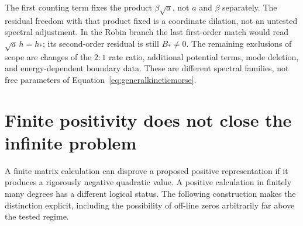 \documentclass[11pt,letterpaper]{article}
\numberwithin{equation}{section}
\theoremstyle{definition}
\theoremstyle{remark}
\begin{document}
The first counting term fixes the product $\beta\sqrt a$, not $a$ and $\beta$ separately. The residual freedom with that product fixed is a coordinate dilation, not an untested spectral adjustment. In the Robin branch the last first-order match would read $\sqrt a\,h=h_*$; its second-order residual is still $B_*\neq0$. The remaining exclusions of scope are changes of the $2:1$ rate ratio, additional potential terms, mode deletion, and energy-dependent boundary data. These are different spectral families, not free parameters of Equation~\eqref{eq:generalkineticmorse}.

\section{Finite positivity does not close the infinite problem}
\label{sec:finite}
A finite matrix calculation can disprove a proposed positive representation if it produces a rigorously negative quadratic value. A positive calculation in finitely many degrees has a different logical status. The following construction makes the distinction explicit, including the possibility of off-line zeros arbitrarily far above the tested regime.
\end{document}
